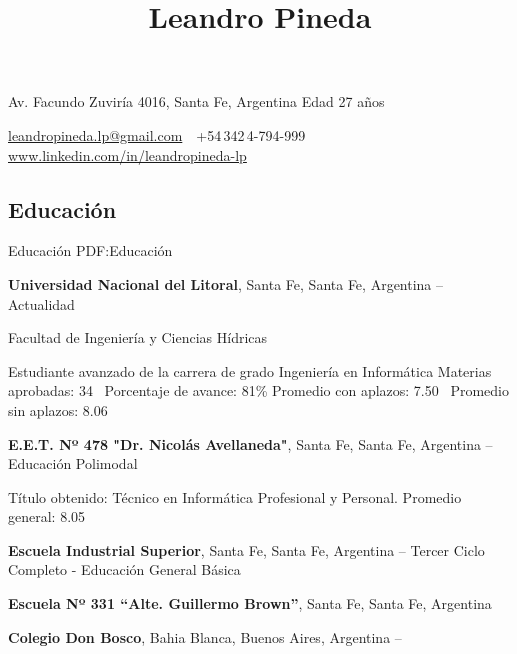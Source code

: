 \documentclass[letterpaper,MMMyyyy,nonstop]{simpleresumecv}
\newcommand{\CVAuthor}{Leandro Pineda}
\newcommand{\CVWebpage}{www.linkedin.com/in/leandropineda-lp}
\begin{document}

\title{\CVAuthor}

\begin{subtitle}
Av. Facundo Zuviría 4016, Santa Fe, Argentina\,\SubBulletSymbol\,Edad 27 años
\par
\href{mailto:leandropineda.lp@gmail.com}
{leandropineda.lp@gmail.com}
\,\SubBulletSymbol\,
+54\,342\,4-794-999
\,\SubBulletSymbol\,
\href{\CVWebpage}
{\CVWebpage}
\end{subtitle}

\begin{body}


\section
{Educación}
{Educación}
{PDF:Educación}

\textbf{Universidad Nacional del Litoral},
Santa Fe, Santa Fe, Argentina
\hfill
{} --
Actualidad

\BulletItem Facultad de Ingeniería y Ciencias Hídricas
\begin{detail}
	\SubBulletItem
	Estudiante avanzado de la carrera de grado Ingeniería en Informática
	\SubBulletItem
	Materias aprobadas: 34 \SubBulletSymbol\, Porcentaje de avance: 81\%
	\SubBulletItem Promedio con aplazos: 7.50 \SubBulletSymbol\, Promedio sin aplazos: 8.06
\end{detail}

\BigGap
\textbf{E.E.T. Nº 478 "Dr. Nicolás Avellaneda"},
Santa Fe, Santa Fe, Argentina
\hfill
{} --
\BulletItem Educación Polimodal
\begin{detail}
	\SubBulletItem
	Título obtenido: Técnico en Informática Profesional y Personal.
	\SubBulletItem
	Promedio general: 8.05
\end{detail}

\BigGap
\textbf{Escuela Industrial Superior},
Santa Fe, Santa Fe, Argentina
\hfill
{} --
\BulletItem
Tercer Ciclo Completo - Educación General Básica

\BigGap
\textbf{Escuela Nº 331 “Alte. Guillermo Brown”},
Santa Fe, Santa Fe, Argentina
\hfill
{}


\BigGap
\textbf{Colegio Don Bosco},
Bahia Blanca, Buenos Aires, Argentina
\hfill
{} --


\end{body}
\end{document}
